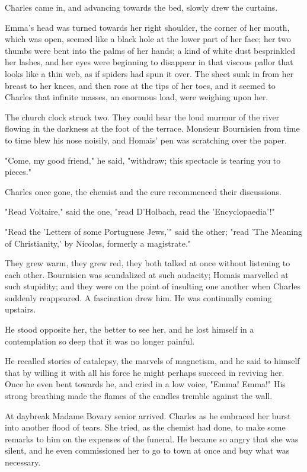 \documentclass[11pt,twocolumn]{ltugboat}
\begin{document}
Charles came in, and advancing towards the bed, slowly drew the
curtains.

Emma's head was turned towards her right shoulder, the corner of her
mouth, which was open, seemed like a black hole at the lower part of her
face; her two thumbs were bent into the palms of her hands; a kind
of white dust besprinkled her lashes, and her eyes were beginning to
disappear in that viscous pallor that looks like a thin web, as if
spiders had spun it over. The sheet sunk in from her breast to her
knees, and then rose at the tips of her toes, and it seemed to Charles
that infinite masses, an enormous load, were weighing upon her.

The church clock struck two. They could hear the loud murmur of the
river flowing in the darkness at the foot of the terrace. Monsieur
Bournisien from time to time blew his nose noisily, and Homais' pen was
scratching over the paper.

"Come, my good friend," he said, "withdraw; this spectacle is tearing
you to pieces."

Charles once gone, the chemist and the cure recommenced their
discussions.

"Read Voltaire," said the one, "read D'Holbach, read the
'Encyclopaedia'!"

"Read the 'Letters of some Portuguese Jews,'" said the other; "read 'The
Meaning of Christianity,' by Nicolas, formerly a magistrate."

They grew warm, they grew red, they both talked at once without
listening to each other. Bournisien was scandalized at such audacity;
Homais marvelled at such stupidity; and they were on the point of
insulting one another when Charles suddenly reappeared. A fascination
drew him. He was continually coming upstairs.

He stood opposite her, the better to see her, and he lost himself in a
contemplation so deep that it was no longer painful.

He recalled stories of catalepsy, the marvels of magnetism, and he
said to himself that by willing it with all his force he might perhaps
succeed in reviving her. Once he even bent towards he, and cried in a
low voice, "Emma! Emma!" His strong breathing made the flames of the
candles tremble against the wall.

At daybreak Madame Bovary senior arrived. Charles as he embraced her
burst into another flood of tears. She tried, as the chemist had done,
to make some remarks to him on the expenses of the funeral. He became so
angry that she was silent, and he even commissioned her to go to town at
once and buy what was necessary.
\end{document}
